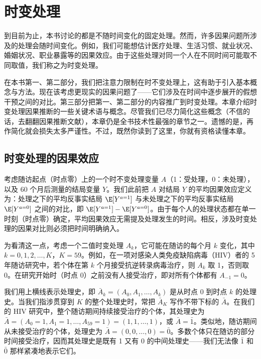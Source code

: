\chapter[\hspace{0.6em}时变处理]{时变处理}

到目前为止，本书讨论的都是不随时间变化的固定处理。然而，许多因果问题所涉及的处理会随时间变化。例如，我们可能想估计医疗处理、生活习惯、就业状况、婚姻状况、职业暴露等的因果效应。由于这些处理对同一个人在不同时间可能取不同取值，我们称之为时变处理。

在本书第一、第二部分，我们把注意力限制在时不变处理上，这有助于引入基本概念与方法。现在该考虑更现实的因果问题了——它们涉及在时间中逐步展开的假想干预之间的对比。第三部分把第一、第二部分的内容推广到时变处理。本章介绍时变处理因果推断的一些关键术语与概念。尽管我们已尽力简化这些概念（不信的话，去翻翻因果推断文献），本章仍是全书技术性最强的章节之一。遗憾的是，再作简化就会损失太多严谨性。不过，既然你读到了这里，你就有资格读懂本章。

\section{时变处理的因果效应}

考虑随访起点（时点零）上的一个时不变处理变量 $A$（1：受处理，0：未处理），以及 60 个月后测量的结局变量 $Y$。我们此前把 $A$ 对结局 $Y$ 的平均因果效应定义为：处理之下的平均反事实结局 $\E[Y^{a=1}]$ 与未处理之下的平均反事实结局 $\E[Y^{a=0}]$ 之间的对比，即 $\E[Y^{a=1}]-\E[Y^{a=0}]$。由于每个人的处理状态都在单一时刻（时点零）确定，平均因果效应无需提及处理发生的时间。相反，涉及时变处理的因果对比则必须把时间明确纳入。

为看清这一点，考虑一个二值时变处理 $A_k$，它可能在随访的每个月 $k$ 变化，其中 $k=0,1,2,\ldots,K$，$K=59$。例如，在一项对感染人类免疫缺陷病毒（HIV）者的 5 年随访研究中，若个体在第 $k$ 个月接受抗逆转录病毒治疗，则 $A_k$ 取 1，否则取 0。在研究开始时（时点 0）之前没有人接受治疗，即对所有个体都有 $A_{-1}=0$。


我们用上横线表示处理史，即 $\bar{A}_k=(A_0,A_1,\ldots,A_k)$ 是从时点 0 到时点 $k$ 的处理史。当我们指涉贯穿到 $K$ 的整个处理史时，常把 $\bar{A}_K$ 写作不带下标的 $\bar{A}$。在我们的 HIV 研究中，整个随访期间持续接受治疗的个体，其处理史为 $\bar{A}=(A_0=1,A_1=1,\ldots,A_{59}=1)=(1,1,\ldots,1)$，或 $\bar{A}=\bar{1}$。类似地，随访期间从未接受治疗的个体，处理史为 $\bar{A}=(0,0,\ldots,0)=\bar{0}$。多数个体只在随访的部分时间接受治疗，因而其处理史是既有 1 又有 0 的中间处理史——我们无法像 $\bar{1}$ 和 $\bar{0}$ 那样紧凑地表示它们。

